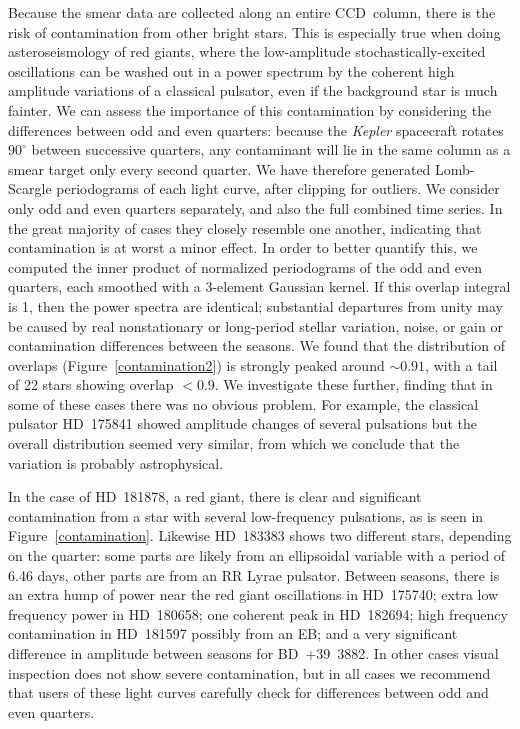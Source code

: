 \documentclass[a4paper,fleqn,usenatbib]{mnras}
\newcommand{\kepler}{\textit{Kepler}\xspace}
\begin{document}
Because the smear data are collected along an entire CCD~column, there is the risk of contamination from other bright stars. This is especially true when doing asteroseismology of red giants, where the low-amplitude stochastically-excited oscillations can be washed out in a power spectrum by the coherent high amplitude variations of a classical pulsator, even if the background star is much fainter. We can assess the importance of this contamination by considering the differences between odd and even quarters: because the \kepler spacecraft rotates $90^{\circ}$ between successive quarters, any contaminant will lie in the same column as a smear target only every second quarter. We have therefore generated Lomb-Scargle periodograms \citep{lomb,scargle} of each light curve, after clipping for outliers. We consider only odd and even quarters separately, and also the full combined time series. In the great majority of cases they closely resemble one another, indicating that contamination is at worst a minor effect. In order to better quantify this, we computed the inner product of normalized periodograms of the odd and even quarters, each smoothed with a 3-element Gaussian kernel. If this overlap integral is 1, then the power spectra are identical; substantial departures from unity may be caused by real nonstationary or long-period stellar variation, noise, or gain or contamination differences between the seasons. We found that the distribution of overlaps (Figure~\ref{contamination2}) is strongly peaked around $\sim 0.91$, with a tail of 22 stars showing overlap $< 0.9$. We investigate these further, finding that in some of these cases  there was no obvious problem. For example, the classical pulsator HD~175841 showed amplitude changes of several pulsations but the overall distribution seemed very similar, from which we conclude that the variation is probably astrophysical. 

In the case of HD~181878, a red giant, there is clear and significant contamination from a star with several low-frequency pulsations, as is seen in Figure~\ref{contamination}. Likewise HD~183383 shows two different stars, depending on the quarter: some parts are likely from an ellipsoidal variable with a period of 6.46 days, other parts are from an RR Lyrae pulsator. Between seasons, there is an extra hump of power near the red giant oscillations in HD~175740; extra low frequency power in HD~180658; one coherent peak in  HD~182694; high frequency contamination in HD~181597 possibly from an EB; and a very significant difference in amplitude between seasons for BD~+39~3882. In other cases visual inspection does not show severe contamination, but in all cases we recommend that users of these light curves carefully check for differences between odd and even quarters.
\end{document}
